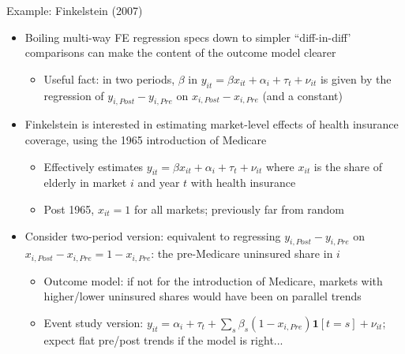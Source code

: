 \documentclass[11pt,english]{beamer}
\begin{document}
\begin{frame}{Example: Finkelstein (2007)}

\begin{itemize}
\item Boiling multi-way FE regression specs down to simpler ``diff-in-diff' comparisons can make the content of the outcome model clearer\smallskip
\begin{itemize}
\item Useful fact: in two periods, $\beta$ in $y_{it}=\beta x_{it}+\alpha_i+\tau_t+\nu_{it}$ is given by the regression of $y_{i,Post}-y_{i,Pre}$ on $x_{i,Post}-x_{i,Pre}$ (and a constant)
\end{itemize}\medskip\pause{}

\item Finkelstein is interested in estimating market-level effects of health insurance coverage, using the 1965 introduction of Medicare\smallskip\pause{}
\begin{itemize}
\item Effectively estimates $y_{it}=\beta x_{it}+\alpha_i+\tau_t+\nu_{it}$ where $x_{it}$ is the share of elderly in market $i$ and year $t$ with health insurance\smallskip\pause{}
\item Post 1965, $x_{it}=1$ for all markets; previously far from random
\end{itemize}\medskip\pause{}

\item Consider two-period version: equivalent to regressing $y_{i,Post}-y_{i,Pre}$ on $x_{i,Post}-x_{i,Pre}=1-x_{i,Pre}$: the pre-Medicare uninsured share in $i$\smallskip\pause{}
\begin{itemize}
\item Outcome model: if not for the introduction of Medicare, markets with higher/lower uninsured shares would have been on parallel trends\smallskip\pause{}
\item Event study version: $y_{it} = \alpha_i + \tau_t + \sum_{s} \beta_s (1-x_{i,Pre}) \mathbf{1}[t=s] + \nu_{it}$; 
expect flat pre/post trends if the model is right...
\end{itemize}
\end{itemize}

\end{frame}
\end{document}
